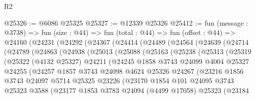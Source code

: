 \begin{lexlean}{R2}
\begin{coremodule}
@25326 := @6086 @25325
@25327 := @12339 @25326
@25412 := fun (message : @3738) =>
  fun (size : @44) =>
  fun (total : @44) =>
  fun (offset : @44) =>
  @24160
    (@24231
      (@24292
        (@24367
          (@24414
            (@24489
              (@24564
                (@24639
                  (@24714
                    (@24789
                      (@24863
                        (@24938
                          (@25013
                            (@25088
                              (@25163
                                (@25238
                                  (@25313
                                    (@25319
                                      (@25322
                                        (@4132 @25327)
                                        @24211
                                        (@24245
                                          @1858
                                          @3743
                                          @24099
                                          @4004
                                          @25327
                                          @24255
                                          (@24257
                                            @1857
                                            @3743
                                            @24098
                                            @4624
                                            @25326
                                            @24267
                                            (@23216
                                              @1856
                                              @3743
                                              @24097
                                              @5714
                                              @25325
                                              @23226
                                              (@23170
                                                @1854
                                                @101
                                                @24095
                                                @3743
                                                @25323
                                                @3588
                                                (@23177
                                                  @1853
                                                  @3783
                                                  @24094
                                                  (@4499 @17058)
                                                  @25323
                                                  (@23184

\end{coremodule}
\end{lexlean}
